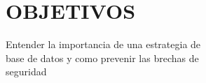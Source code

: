 \section{OBJETIVOS}
Entender la importancia de una estrategia de \\base de datos y como prevenir las brechas de \\seguridad